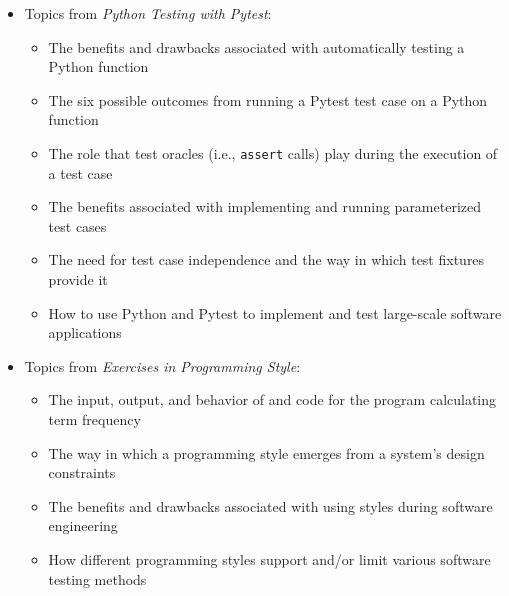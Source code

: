 \documentclass[11pt]{article}
\newcommand{\programmingstyle}{{\em Exercises in Programming Style\/}}
\newcommand{\pytest}{{\em Python Testing with Pytest\/}}
\newcommand{\program}[1]{\lstinline{#1}}
\begin{document}
\begin{itemize}
\begin{itemize}
    \end{itemize}

  \item Topics from \pytest{}:
    \vspace*{-.05in}
    \begin{itemize}

      \itemsep 0.1in

      \item The benefits and drawbacks associated with automatically testing a
        Python function

      \item The six possible outcomes from running a Pytest test case on a
        Python function

      \item The role that test oracles (i.e., \program{assert} calls) play
        during the execution of a test case

      \item The benefits associated with implementing and running parameterized
        test cases

      \item The need for test case independence and the way in which test
        fixtures provide it

      \item How to use Python and Pytest to implement and test large-scale
        software applications

    \end{itemize}

  \item Topics from \programmingstyle{}:
    \vspace*{-.05in}
    \begin{itemize}

      \itemsep 0.1in

      \item The input, output, and behavior of and code for the program
        calculating term frequency

      \item The way in which a programming style emerges from a system's design constraints

      \item The benefits and drawbacks associated with using styles during
        software engineering

      \item How different programming styles support and/or limit various
        software testing methods


\end{itemize}
\end{itemize}
\end{document}
